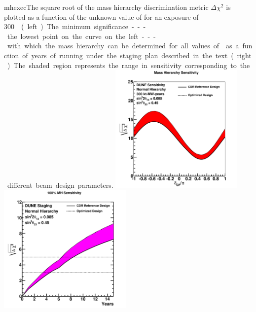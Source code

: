 \begin{cdrfigure}{mhexec}{The
    square root of the mass hierarchy discrimination metric $\Delta
    \chi^2$ is plotted as a function of the unknown value of \deltacp
    for an exposure of \SI{300}\ktMWyr{} %
    (left).  The minimum significance
    --- the lowest point on the curve on the left --- with which the mass
    hierarchy can be determined for all values of \deltacp as a
    function of years of running under the staging plan described in the text (right).
    The shaded region represents the range in sensitivity corresponding to
    the different beam design parameters.}
\includegraphics[width=0.49\textwidth]{volume-physics/figures/mh_300ktmwyear}
\includegraphics[width=0.49\textwidth]{volume-physics/figures/mh_exp_staging15yr}
\label{fig:mhexec}
\end{cdrfigure}


